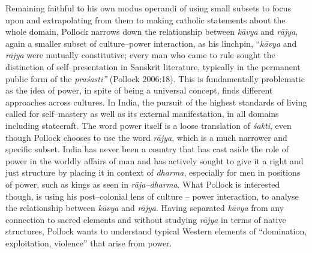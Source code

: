 Remaining faithful to his own modus operandi of using small subsets to focus upon and extrapolating from them to making catholic statements about the whole domain, Pollock narrows down the relationship between \textit{kāvya} and \textit{rājya}, again a smaller subset of culture–power interaction, as his linchpin, “\textit{kāvya} and \textit{rājya} were mutually constitutive; every man who came to rule sought the distinction of self–presentation in Sanskrit literature, typically in the permanent public form of the \textit{praśasti”} (Pollock 2006:18). This is fundamentally problematic as the idea of power, in spite of being a universal concept, finds different approaches across cultures. In India, the pursuit of the highest standards of living called for self–mastery as well as its external manifestation, in all domains including statecraft. The word power itself is a loose translation of \textit{śakti}, even though Pollock chooses to use the word \textit{rājya}, which is a much narrower and specific subset. India has never been a country that has cast aside the role of power in the worldly affairs of man and has actively sought to give it a right and just structure by placing it in context of \textit{dharma}, especially for men in positions of power, such as kings as seen in \textit{rāja–dharma}. What Pollock is interested though, is using his post–colonial lens of culture – power interaction, to analyse the relationship between \textit{kāvya} and \textit{rājya}. Having separated \textit{kāvya} from any connection to sacred elements and without studying \textit{rājya} in terms of native structures, Pollock wants to understand typical Western elements of “domination, exploitation, violence” that arise from power. 

